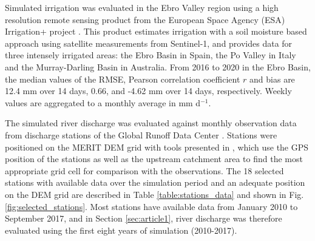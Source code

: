 Simulated irrigation was evaluated in the Ebro Valley region using a high resolution remote sensing product from the European Space Agency (ESA) Irrigation+ project \citep{dari_regional_2023}. This product estimates irrigation with a soil moisture based approach using satellite measurements from Sentinel-1, and provides data for three intensely irrigated areas: the Ebro Basin in Spain, the Po Valley in Italy and the Murray-Darling Basin in Australia. From 2016 to 2020 in the Ebro Basin, the median values of the RMSE, Pearson correlation coefficient $r$ and bias are 12.4 mm over 14 days, 0.66, and -4.62 mm over 14 days, respectively. Weekly values are aggregated to a monthly average in mm d$^{-1}$. 


\begin{table}[h]
    \caption{Datasets used for evaluation.}
    \label{tab:obs-datasets}
\end{table}


The simulated river discharge was evaluated against monthly observation data from discharge stations of the Global Runoff Data Center \citep[GRDC, https://grdc.bafg.de,][]{fekete_global_2003}.
Stations were positioned on the MERIT DEM grid with tools presented in \cite{polcher_hydrological_2023}, which use the GPS position of the stations as well as the upstream catchment area to find the most appropriate grid cell for comparison with the observations. 
The 18 selected stations with available data over the simulation period and an adequate position on the DEM grid are described in Table \ref{table:stations_data} and shown in Fig. \ref{fig:selected_stations}. Most stations have available data from January 2010 to September 2017, and in Section \ref{sec:article1}, river discharge was therefore evaluated using the first eight years of simulation (2010-2017).

